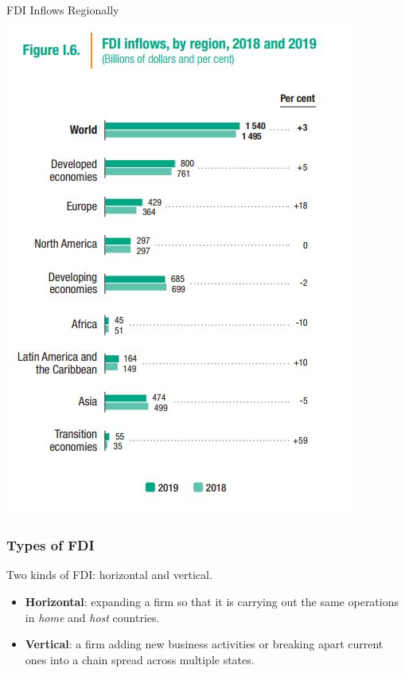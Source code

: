 \documentclass{beamer}
\begin{document}
\begin{frame}{\LARGE FDI Inflows Regionally}
	\centering
	\includegraphics[width=\textwidth,height=0.9\textheight,keepaspectratio]{FDI inflows by region.JPG}
\end{frame}

\begin{frame} 
	\frametitle{\LARGE{Types of FDI}}
	Two kinds of FDI: horizontal and vertical.
	\begin{itemize}
		\item \textbf{Horizontal}: expanding a firm so that it is carrying out the same operations in \textit{home} and \textit{host} countries. \pause
		\item \textbf{Vertical}: a firm adding new business activities or breaking apart current ones into a chain spread across multiple states.
	\end{itemize}
\end{frame}
\end{document}
